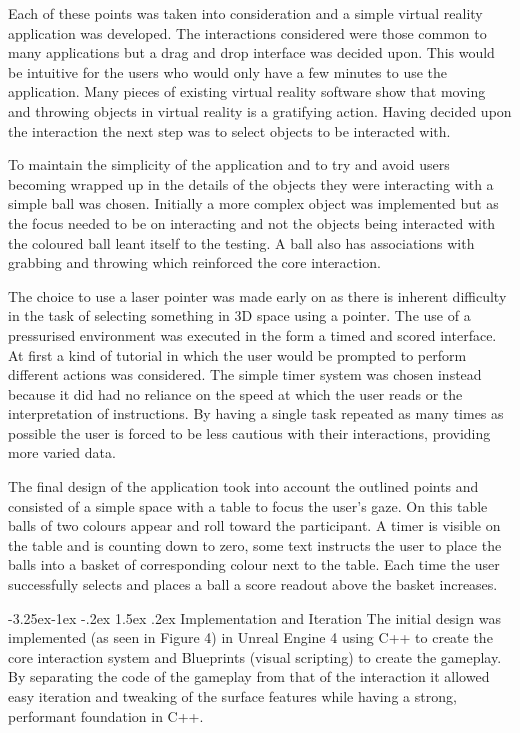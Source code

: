 \documentclass[12pt]{article}
\makeatletter
\renewcommand{\subsubsection}{\@startsection{subsubsection}{2}{\z@}%
             {-3.25ex\@plus -1ex \@minus -.2ex}%
             {1.5ex \@plus .2ex}%
             {\normalfont\normalsize\scshape\bfseries}}
\makeatother
\begin{document}
Each of these points was taken into consideration and a simple virtual reality application was developed. The interactions considered were those common to many applications but a drag and drop interface was decided upon. This would be intuitive for the users who would only have a few minutes to use the application. Many pieces of existing virtual reality software  show that moving and throwing objects in virtual reality is a gratifying action. Having decided upon the interaction the next step was to select objects to be interacted with.

To maintain the simplicity of the application and to try and avoid users becoming wrapped up in the details of the objects they were interacting with a simple ball was chosen. Initially a more complex object was implemented but as the focus needed to be on interacting and not the objects being interacted with the coloured ball leant itself to the testing. A ball also has associations with grabbing and throwing which reinforced the core interaction.

The choice to use a laser pointer was made early on as there is inherent difficulty in the task of selecting something in 3D space using a pointer. The use of a pressurised environment was executed in the form a timed and scored interface. At first a kind of tutorial in which the user would be prompted to perform different actions was considered. The simple timer system was chosen instead because it did had no reliance on the speed at which the user reads or the interpretation of instructions. By having a single task repeated as many times as possible the user is forced to be less cautious with their interactions, providing more varied data.

The final design of the application took into account the outlined points and consisted of a simple space with a table to focus the user's gaze. On this table balls of two colours appear and roll toward the participant. A timer is visible on the table and is counting down to zero, some text instructs the user to place the balls into a basket of corresponding colour next to the table. Each time the user successfully selects and places a ball a score readout above the basket increases.

\subsubsection{Implementation and Iteration}
The initial design was implemented (as seen in Figure 4) in Unreal Engine 4 using C++ to create the core interaction system and Blueprints (visual scripting) to create the gameplay. By separating the code of the gameplay from that of the interaction it allowed easy iteration and tweaking of the surface features while having a strong, performant foundation in C++. 
\end{document}
